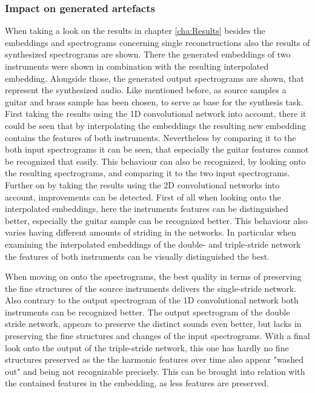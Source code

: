 \subsubsection{Impact on generated artefacts}
When taking a look on the results in chapter \ref{cha:Results} besides the embeddings and spectrograms concerning single reconstructions also the results of synthesized spectrograms are shown. There the generated embeddings of two instruments were shown in combination with the resulting interpolated embedding. Alongside those, the generated output spectrograms are shown, that represent the synthesized audio. Like mentioned before, as source samples a guitar and brass sample has been chosen, to serve as base for the synthesis task. First taking the results using the 1D convolutional network into account, there it could be seen that by interpolating the embeddings the resulting new embedding contains the features of both instruments. Nevertheless by comparing it to the both input spectrograms it can be seen, that especially the guitar features cannot be recognized that easily. This behaviour can also be recognized, by looking onto the resulting spectrograms, and comparing it to the two input spectrograms. Further on by taking the results using the 2D convolutional networks into account, improvements can be detected. First of all when looking onto the interpolated embeddings, here the instruments features can be distinguished better, especially the guitar sample can be recognized better. This behaviour also varies having different amounts of striding in the networks. In particular when examining the interpolated embeddings of the double- and triple-stride network the features of both instruments can be visually distinguished the best. 

When moving on onto the spectrograms, the best quality in terms of preserving the fine structures of the source instruments delivers the single-stride network. Also contrary to the output spectrogram of the 1D convolutional network both instruments can be recognized better. The output spectrogram of the double stride network, appears to preserve the distinct sounds even better, but lacks in preserving the fine structures and changes of the input spectrograms. With a final look onto the output of the triple-stride network, this one has hardly no fine structures preserved as the the harmonic features over time also appear "washed out" and being not recognizable precisely. This can be brought into relation with the contained features in the embedding, as less features are preserved.

